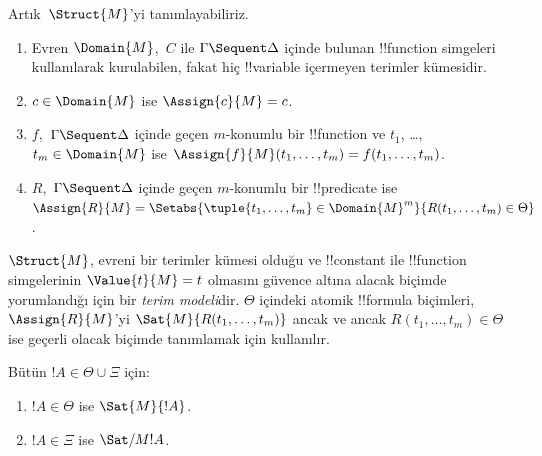 Artık~$\Struct{M}$'yi tanımlayabiliriz.
\begin{enumerate}
\item Evren $\Domain{M}$,~$C$ ile $\Gamma \Sequent \Delta$ içinde bulunan
!!{function} simgeleri kullanılarak kurulabilen, fakat hiç !!{variable} içermeyen
terimler kümesidir.
\item $c \in \Domain{M}$ ise $\Assign{c}{M} = c$.
\item $f$,~$\Gamma \Sequent \Delta$ içinde geçen $m$-konumlu bir
!!{function} ve $t_1$, \dots, $t_m \in \Domain{M}$ ise
$\Assign{f}{M}(t_1, \dots, t_m) = f(t_1, \dots, t_m)$.
\item $R$,~$\Gamma \Sequent \Delta$ içinde geçen $m$-konumlu bir
!!{predicate} ise $\Assign{R}{M} = \Setabs{\tuple{t_1, \dots, t_m} \in
\Domain{M}^m}{R(t_1, \dots, t_m) \in \Theta}$.
\end{enumerate}
$\Struct{M}$, evreni bir terimler kümesi olduğu ve !!{constant} ile
!!{function} simgelerinin $\Value{t}{M} = t$ olmasını güvence altına alacak biçimde
yorumlandığı için bir \emph{terim modeli}dir. $\Theta$ içindeki atomik
!!{formula} biçimleri, $\Assign{R}{M}$'yi $\Sat{M}{R(t_1, \dots, t_m)}$ ancak ve
ancak $R(t_1, \dots, t_m) \in \Theta$ ise geçerli olacak biçimde tanımlamak
için kullanılır.

\begin{lem}
Bütün $!A \in \Theta \cup \Xi$ için:
\begin{enumerate}
  \item $!A \in \Theta$ ise $\Sat{M}{!A}$.
  \item $!A \in \Xi$ ise $\Sat/{M}{!A}$.
\end{enumerate}
\end{lem}

